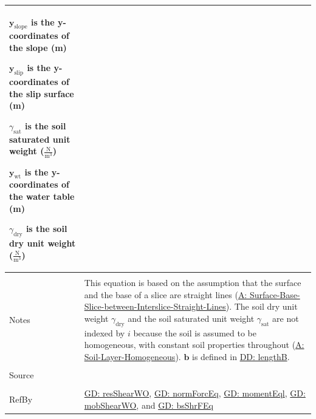 \documentclass[12pt]{article}
\begin{document}
\begin{minipage}{\textwidth}
\begin{tabular}{>{\raggedright}p{}>{\raggedright\arraybackslash}p{}}
\begin{symbDescription}
              \item{${\mathbf{y}_{\text{slope}}}$ is the y-coordinates of the slope (m)}
              \item{${\mathbf{y}_{\text{slip}}}$ is the y-coordinates of the slip surface (m)}
              \item{${γ_{\text{sat}}}$ is the soil saturated unit weight ($\frac{\text{N}}{\text{m}^{3}}$)}
              \item{${\mathbf{y}_{\text{wt}}}$ is the y-coordinates of the water table (m)}
              \item{${γ_{\text{dry}}}$ is the soil dry unit weight ($\frac{\text{N}}{\text{m}^{3}}$)}
              \end{symbDescription}
\\ \midrule \\
Notes & This equation is based on the assumption that the surface and the base of a slice are straight lines (\hyperref[assumpSBSBISL]{A: Surface-Base-Slice-between-Interslice-Straight-Lines}). The soil dry unit weight ${γ_{\text{dry}}}$ and the soil saturated unit weight ${γ_{\text{sat}}}$ are not indexed by $i$ because the soil is assumed to be homogeneous, with constant soil properties throughout (\hyperref[assumpSLH]{A: Soil-Layer-Homogeneous}). $\mathbf{b}$ is defined in \hyperref[DD:lengthB]{DD: lengthB}.
\\ \midrule \\
Source & \cite{fredlund1977}
\\ \midrule \\
RefBy & \hyperref[GD:resShearWO]{GD: resShearWO}, \hyperref[GD:normForcEq]{GD: normForcEq}, \hyperref[GD:momentEql]{GD: momentEql}, \hyperref[GD:mobShearWO]{GD: mobShearWO}, and \hyperref[GD:bsShrFEq]{GD: bsShrFEq}
\\ \bottomrule
\end{tabular}
\end{minipage}
\end{document}
